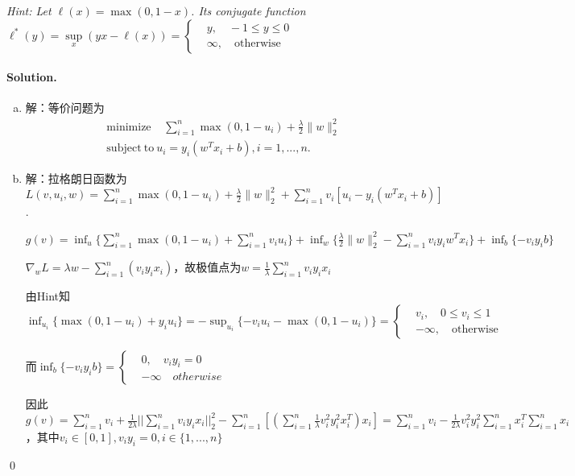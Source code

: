 \documentclass[a4paper]{article}
\newenvironment{solution}
{\color{blue} \paragraph{Solution.}}
{\newline \qed}
\begin{document}
\noindent\emph{Hint: Let $\ell(x)=\max(0,1-x)$. Its conjugate function $\ell^\ast(y)=\sup\limits_{x}(yx-\ell(x))=\left\{
\begin{aligned}
&y, \quad-1\leq y\leq0 \\
&\infty,\quad\text{otherwise}
\end{aligned}
\right.$}
\begin{solution}
    \begin{enumerate}[a)]
        \item 解：等价问题为
            \begin{equation*}
                \begin{split}
                    &\text{minimize~~}\ \ \sum_{i=1}^n\max(0, 1-u_i)+\frac{\lambda}2\|w\|_2^2\\
                    &\text{subject}\ \text{to}\ u_i=y_i(w^Tx_i+b), i=1, ...,n.
                \end{split}
            \end{equation*}

        \item 解：拉格朗日函数为$L(v, u_i, w)=\sum_{i=1}^n\max(0, 1-u_i)+\frac \lambda 2\|w\|_2^2 + \sum_{i=1}^n v_i[u_i-y_i(w^Tx_i + b)]$.
        
                $g(v)=\inf_{u}\{\sum_{i=1}^n\max(0, 1-u_i)+\sum_{i=1}^n v_iu_i\}+\inf_w\{\frac \lambda 2 \|w\|_2^2-\sum_{i=1}^nv_iy_iw^Tx_i\}+\inf_b\{-v_iy_ib\}$

                $\nabla_w L=\lambda w-\sum_{i=1}^n(v_iy_ix_i)$，故极值点为$w=\frac 1\lambda\sum_{i=1}^nv_iy_ix_i$

                由Hint知$\inf_{u_i}\{\max(0, 1-u_i)+y_iu_i\}=-\sup_{u_i}\{-v_iu_i-\max(0, 1-u_i)\}=\left\{
                \begin{aligned}
                    &v_i, \quad 0\leq v_i\leq 1 \\
                    &-\infty,\quad\text{otherwise}
                \end{aligned}\right.$

                而$\inf_b\{-v_iy_ib\}=\left\{
                \begin{aligned}
                    &0, \quad v_iy_i=0\\
                    &-\infty \quad otherwise
                \end{aligned}\right.$

                因此$g(v)=\sum_{i=1}^n v_i+\frac 1{2\lambda}||\sum_{i=1}^nv_iy_ix_i||_2^2-\sum_{i=1}^n[(\sum_{i=1}^n \frac 1\lambda v_i^2y_i^2x_i^T)x_i]=\sum_{i=1}^n v_i-\frac 1{2\lambda}v_i^2y_i^2\sum_{i=1}^nx_i^T\sum_{i=1}^nx_i$，其中$v_i\in[0, 1],v_iy_i=0, i\in\{1, ...,n\}$


\end{enumerate}
\end{solution}
\end{document}
